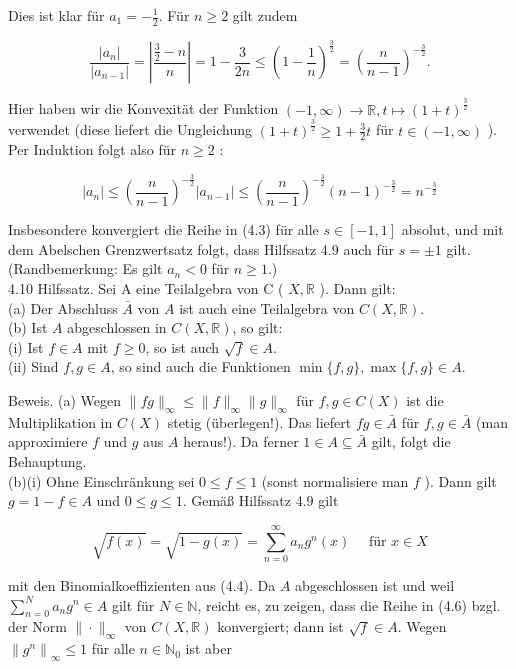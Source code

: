 \documentclass[10pt, letterpaper]{article}
\begin{document}
Dies ist klar für $a_{1}=-\frac{1}{2}$. Für $n \geq 2$ gilt zudem

$$
\frac{\left|a_{n}\right|}{\left|a_{n-1}\right|}=\left|\frac{\frac{3}{2}-n}{n}\right|=1-\frac{3}{2 n} \leq\left(1-\frac{1}{n}\right)^{\frac{3}{2}}=\left(\frac{n}{n-1}\right)^{-\frac{3}{2}} .
$$

Hier haben wir die Konvexität der Funktion $(-1, \infty) \rightarrow \mathbb{R}, t \mapsto(1+t)^{\frac{3}{2}}$ verwendet (diese liefert die Ungleichung $(1+t)^{\frac{3}{2}} \geq 1+\frac{3}{2} t$ für $t \in(-1, \infty)$ ). Per Induktion folgt also für $n \geq 2$ :

$$
\left|a_{n}\right| \leq\left(\frac{n}{n-1}\right)^{-\frac{3}{2}}\left|a_{n-1}\right| \leq\left(\frac{n}{n-1}\right)^{-\frac{3}{2}}(n-1)^{-\frac{3}{2}}=n^{-\frac{3}{2}}
$$

Insbesondere konvergiert die Reihe in (4.3) für alle $s \in[-1,1]$ absolut, und mit dem Abelschen Grenzwertsatz folgt, dass Hilfssatz 4.9 auch für $s= \pm 1$ gilt. (Randbemerkung: Es gilt $a_{n}<0$ für $n \geq 1$.)\\
4.10 Hilfssatz. Sei A eine Teilalgebra von C ( $X, \mathbb{R}$ ). Dann gilt:\\
(a) Der Abschluss $\bar{A}$ von $A$ ist auch eine Teilalgebra von $C(X, \mathbb{R})$.\\
(b) Ist $A$ abgeschlossen in $C(X, \mathbb{R})$, so gilt:\\
(i) Ist $f \in A$ mit $f \geq 0$, so ist auch $\sqrt{f} \in A$.\\
(ii) Sind $f, g \in A$, so sind auch die Funktionen $\min \{f, g\}, \max \{f, g\} \in A$.

Beweis. (a) Wegen $\|f g\|_{\infty} \leq\|f\|_{\infty}\|g\|_{\infty}$ für $f, g \in C(X)$ ist die Multiplikation in $C(X)$ stetig (überlegen!). Das liefert $f g \in \bar{A}$ für $f, g \in \bar{A}$ (man approximiere $f$ und $g$ aus $A$ heraus!). Da ferner $1 \in A \subseteq \bar{A}$ gilt, folgt die Behauptung.\\
(b)(i) Ohne Einschränkung sei $0 \leq f \leq 1$ (sonst normalisiere man $f$ ). Dann gilt $g=1-f \in A$ und $0 \leq g \leq 1$. Gemäß Hilfssatz 4.9 gilt

$$
\sqrt{f(x)}=\sqrt{1-g(x)}=\sum_{n=0}^{\infty} a_{n} g^{n}(x) \quad \text { für } x \in X
$$

mit den Binomialkoeffizienten aus (4.4). Da $A$ abgeschlossen ist und weil $\sum_{n=0}^{N} a_{n} g^{n} \in A$ gilt für $N \in \mathbb{N}$, reicht es, zu zeigen, dass die Reihe in (4.6) bzgl. der Norm $\|\cdot\|_{\infty}$ von $C(X, \mathbb{R})$ konvergiert; dann ist $\sqrt{f} \in A$. Wegen $\left\|g^{n}\right\|_{\infty} \leq 1$ für alle $n \in \mathbb{N}_{0}$ ist aber
\end{document}
